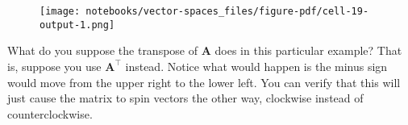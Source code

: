 \documentclass[
  letterpaper,
  DIV=11,
  numbers=noendperiod]{scrreprt}
\newenvironment{Shaded}{\begin{snugshade}}{\end{snugshade}}
\newcommand{\BuiltInTok}[1]{\textcolor[rgb]{0.00,0.23,0.31}{#1}}
\newcommand{\CharTok}[1]{\textcolor[rgb]{0.13,0.47,0.30}{#1}}
\newcommand{\ControlFlowTok}[1]{\textcolor[rgb]{0.00,0.23,0.31}{#1}}
\newcommand{\DecValTok}[1]{\textcolor[rgb]{0.68,0.00,0.00}{#1}}
\newcommand{\FloatTok}[1]{\textcolor[rgb]{0.68,0.00,0.00}{#1}}
\newcommand{\KeywordTok}[1]{\textcolor[rgb]{0.00,0.23,0.31}{#1}}
\newcommand{\NormalTok}[1]{\textcolor[rgb]{0.00,0.23,0.31}{#1}}
\newcommand{\OperatorTok}[1]{\textcolor[rgb]{0.37,0.37,0.37}{#1}}
\newcommand{\SpecialCharTok}[1]{\textcolor[rgb]{0.37,0.37,0.37}{#1}}
\newcommand{\SpecialStringTok}[1]{\textcolor[rgb]{0.13,0.47,0.30}{#1}}
\newcommand{\StringTok}[1]{\textcolor[rgb]{0.13,0.47,0.30}{#1}}
\begin{document}
\begin{Shaded}
\end{Shaded}

\begin{figure}[H]

{\centering \texttt{[image: notebooks/vector-spaces\_files/figure-pdf/cell-19-output-1.png]}

}

\end{figure}

What do you suppose the transpose of \(\mathbf{A}\) does in this
particular example? That is, suppose you use \(\mathbf{A}^\top\)
instead. Notice what would happen is the minus sign would move from the
upper right to the lower left. You can verify that this will just cause
the matrix to spin vectors the other way, clockwise instead of
counterclockwise.
\end{document}
